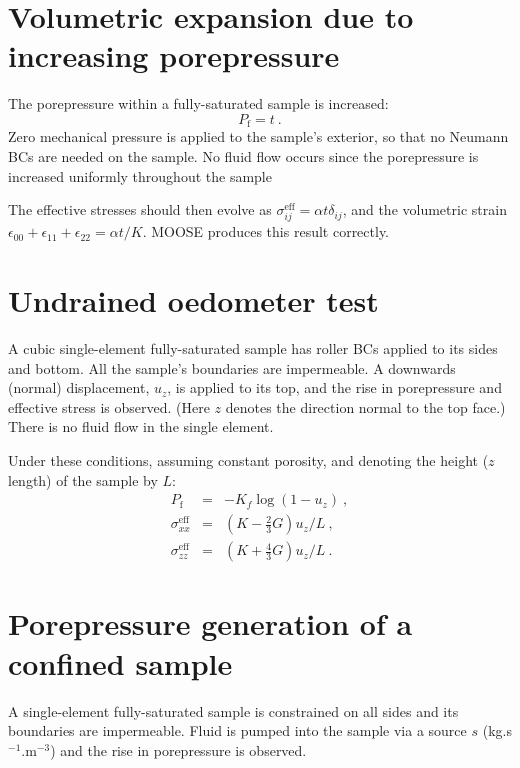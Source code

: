 \section{Volumetric expansion due to increasing porepressure}

The porepressure within a fully-saturated sample is increased:
\begin{equation}
P_{\mathrm{f}} = t \ .
\end{equation}
Zero mechanical pressure is applied to the sample's exterior, so that
no Neumann BCs are needed on the sample.  No fluid flow occurs since
the porepressure is increased uniformly throughout the sample

The effective stresses should then evolve as
$\sigma_{ij}^{\mathrm{eff}} = \alpha t \delta_{ij}$, and the
volumetric strain $\epsilon_{00}+\epsilon_{11}+\epsilon_{22} = \alpha
t/K$.  MOOSE produces this result correctly.

\section{Undrained oedometer test}

A cubic single-element fully-saturated sample has roller BCs applied
to its sides and bottom.  All the sample's boundaries are impermeable.
A downwards (normal) displacement, $u_{z}$, is applied to its
top, and the rise in porepressure and effective stress is observed.
(Here $z$ denotes the direction normal to the top face.)  There is
no fluid flow in the single element.

Under these conditions, assuming constant porosity, and denoting the
height ($z$ length) of the sample by $L$:
\begin{eqnarray}
P_{\mathrm{f}} & = & -K_{f}\log(1 - u_{z}) \ , \nonumber \\
\sigma_{xx}^{\mathrm{eff}} & = & (K - \mbox{$\frac{2}{3}$}G)u_{z}/L \ , \nonumber \\
\sigma_{zz}^{\mathrm{eff}} & = & (K + \mbox{$\frac{4}{3}$}G)u_{z}/L \ .
\end{eqnarray}

\section{Porepressure generation of a confined sample}

A single-element fully-saturated sample is constrained on all sides
and its boundaries are impermeable.  Fluid is pumped into the sample
via a source $s$ (kg.s$^{-1}$.m$^{-3}$) and the rise
in porepressure is observed.

